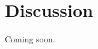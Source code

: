 \documentclass{article}
\begin{document}



\section{Discussion}

Coming soon.






\end{document}
